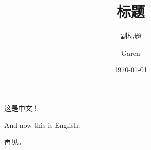 \documentclass[UTF-8]{beamer}
\begin{document}
	\title{标题}
	\subtitle{副标题}
	\author{Garen}
	\date{\today}
	
	\titlepage
	\begin{frame}
		这是中文！
		
		And now this is English.
		
		再见。
	\end{frame}
\end{document}
